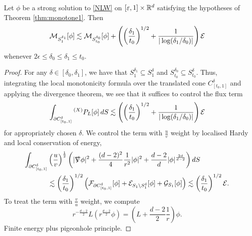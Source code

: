 \begin{corollary}\label{thm:monotone2}
	Let $\phi$ be a strong solution to \eqref{NLW} on $[\varepsilon, 1] \times \mathbb R^d$ satisfying the hypotheses of Theorem \ref{thm:monotone1}. Then
		\[
			\mathcal M_{S^{\delta_1}_1} [\phi] \lesssim \mathcal M_{S^{\delta_0}_{t_0}} [\phi] + \left( \left( \frac{\delta_1}{t_0}\right)^{1/2} + \frac{1}{|\log (\delta_1/\delta_0)|} \right) \mathcal E
		\]	
	whenever $2\epsilon \leq \delta_0 \leq \delta_1 \leq t_0$. 	
\end{corollary}

\begin{proof}
	For any $\delta \in [\delta_0, \delta_1]$, we have that $S^{\delta_1}_1 \subseteq S^\delta_1$ and $S^{\delta_0}_{t_0} \subseteq S^{\delta}_{t_0}$. Thus, integrating the local monotonicity formula over the translated cone $C^\delta_{[t_0, 1]}$ and applying the divergence theorem, we see that it suffices to control the flux term 
		\[
			\int_{\partial C^\delta_{[t_0, 1]}} {^{(X)}} P_L [\phi] \, dS \lesssim  \left( \left( \frac{\delta_1}{t_0}\right)^{1/2} + \frac{1}{|\log (\delta_1/\delta_0)|} \right) \mathcal E
		\]
	for appropriately chosen $\delta$. We control the term with $\tfrac{u}{v}$ weight by localised Hardy and local conservation of energy, 
		\begin{align*}
			\int_{\partial C^\delta_{[t_0, 1]}} &\left( \frac{u}{v} \right)^\frac12 \left( |\slashed \nabla \phi|^2 + \frac{(d - 2)^2}{4} \frac1{r^2} |\phi|^2 + \frac{d - 2}{d} |\phi|^{\frac{2d}{d - 2}} \right) dS\\
				 &\lesssim \left( \frac{\delta_1}{t_0} \right)^{1/2} \left( \mathcal F_{\partial C^\delta_{[t_0, 1]}} [\phi] + \mathcal E_{S_1 \setminus S_1^\delta} [\phi] + \mathcal G_{S_1} [\phi]  \right) \lesssim  \left( \frac{\delta_1}{t_0} \right)^{1/2} \mathcal E. 
		\end{align*}
	To treat the term with $\tfrac{v}{u}$ weight, we compute
		\[
			r^{-\frac{d - 2}{2}} L\left( r^{\frac{d- 2}{2}} \phi \right) = \left( L + \frac{d - 2}{2}\frac1r \right) \phi.
		\]	
	Finite energy plus pigeonhole principle. 	
\end{proof}